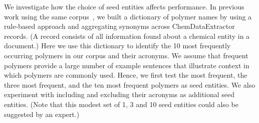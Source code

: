 We investigate how the choice of seed entities affects performance.
In previous work using the same corpus~\cite{tchoua2016hybrid,tchoua2016hybridi}, 
we built a dictionary of polymer names by using a rule-based approach and aggregating synonyms across ChemDataExtractor records. (A record consists of all information found about a chemical entity in a document.)  
Here we use this dictionary to identify the 10 most frequently occurring polymers in our corpus and their acronyms.
We assume that frequent polymers provide a large number of example sentences that illustrate context in which polymers are commonly used.
Hence, we first test the most frequent, the three most frequent, and the ten most frequent polymers as seed entities.
We also experiment with including and excluding their acronyms as additional seed entities.
(Note that this modest set of 1, 3 and 10 seed entities could also be suggested by an expert.)

